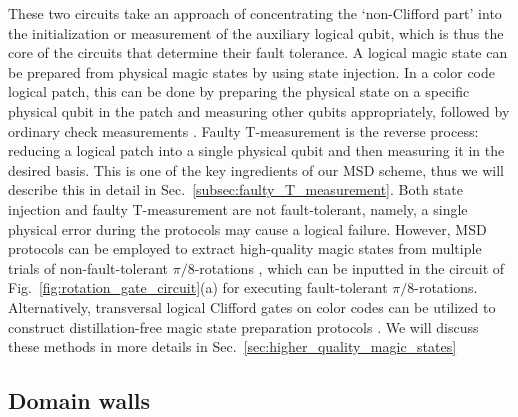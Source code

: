 \documentclass[
 prx,
 reprint,
 superscriptaddress,
 longbibliography,
 dvipsnames
]{revtex4-2}
\begin{document}
These two circuits take an approach of concentrating the `non-Clifford part' into the initialization or measurement of the auxiliary logical qubit, which is thus the core of the circuits that determine their fault tolerance.
A logical magic state can be prepared from physical magic states by using state injection.
In a color code logical patch, this can be done by preparing the physical state on a specific physical qubit in the patch and measuring other qubits appropriately, followed by ordinary check measurements \cite{beverland2021cost}.
Faulty T-measurement is the reverse process: reducing a logical patch into a single physical qubit and then measuring it in the desired basis.
This is one of the key ingredients of our MSD scheme, thus we will describe this in detail in Sec.~\ref{subsec:faulty_T_measurement}.
Both state injection and faulty T-measurement are not fault-tolerant, namely, a single physical error during the protocols may cause a logical failure.
However, MSD protocols can be employed to extract high-quality magic states from multiple trials of non-fault-tolerant $\pi/8$-rotations \cite{bravyi2005universal}, which can be inputted in the circuit of Fig.~\ref{fig:rotation_gate_circuit}(a) for executing fault-tolerant $\pi/8$-rotations.
Alternatively, transversal logical Clifford gates on color codes can be utilized to construct distillation-free magic state preparation protocols \cite{goto2016minimizing, chamberland2019faulttolerant, chamberland2019faulttolerant,chamberland2020very, itogawa2024even}.
We will discuss these methods in more details in Sec.~\ref{sec:higher_quality_magic_states}


\subsection{Domain walls \label{subsec:domain_walls}}
\end{document}
